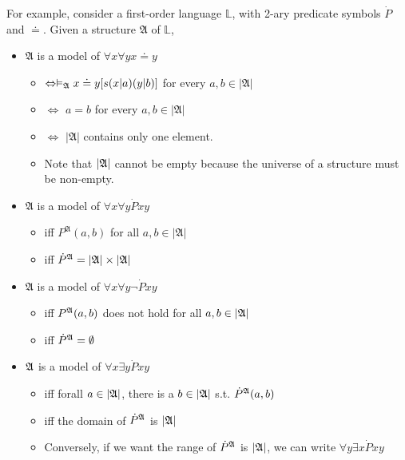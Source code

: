 For example, consider a first-order language $\mathbb{L}$, with 2-ary predicate symbols $\dot{P}$ and $\doteq$. Given a structure $\mathfrak{A}$ of $\mathbb{L}$,

\begin{itemize}
    \item $\mathfrak{A}$ is a model of $\forall x \forall y x \doteq y$
    \begin{itemize}
        \item $\Leftrightarrow \vDash_{\mathfrak{A}}x\doteq y[s(x|a)(y|b)]$ for every $a,b \in |\mathfrak{A}|$
        \item $\Leftrightarrow$ $a = b$ for every $a,b \in|\mathfrak{A}|$
        \item $\Leftrightarrow$ $|\mathfrak{A}|$ contains only one element.
        \item Note that $|\mathfrak{A}|$ cannot be empty because the universe of a structure must be non-empty.
    \end{itemize}
    \item $\mathfrak{A}$ is a model of $\forall x \forall y \dot{P}xy$
    \begin{itemize}
        \item iff $P^\mathfrak{A}(a,b)$ for all $a,b\in|\mathfrak{A}|$
        \item iff $\dot{P}^{\mathfrak{A}} = |\mathfrak{A}| \times |\mathfrak{A}|$
    \end{itemize}
    \item $\mathfrak{A}$ is a model of $\forall x \forall y \neg\dot{P}xy$
    \begin{itemize}
        \item iff $P^{\mathfrak{A}}(a,b)$ does not hold for all $a,b\in|\mathfrak{A}|$
        \item iff $\dot{P}^{\mathfrak{A}} = \emptyset$
    \end{itemize}
    \item $\mathfrak{A}$ is a model of $\forall x \exists y \dot{P}xy$
    \begin{itemize}
        \item iff forall $a\in|\mathfrak{A}|$, there is a $b\in|\mathfrak{A}|$ s.t. $\dot{P}^{\mathfrak{A}}(a,b)$
        \item iff the domain of $\dot{P}^{\mathfrak{A}}$ is $|\mathfrak{A}|$
        \item Conversely, if we want the range of $\dot{P}^{\mathfrak{A}}$ is $|\mathfrak{A}|$, we can write $\forall y \exists x \dot{P}xy$
    \end{itemize}
\end{itemize}

